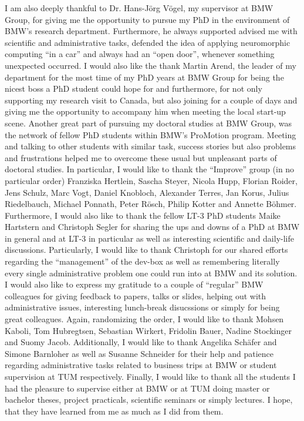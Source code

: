 I am also deeply thankful to Dr. Hans-J\"org V\"ogel, my supervisor at BMW Group, for giving me the opportunity to pursue my PhD in the environment of BMW's research department.
Furthermore, he always supported advised me with scientific and administrative tasks, defended the idea of applying neuromorphic computing \enquote{in a car} and always had an \enquote{open door}, whenever something unexpected occurred.
I would also like the thank Martin Arend, the leader of my department for the most time of my PhD years at BMW Group for being the nicest boss a PhD student could hope for and furthermore, for not only supporting my research visit to Canada, but also joining for a couple of days and giving me the opportunity to accompany him when meeting the local start-up scene.
Another great part of pursuing my doctoral studies at BMW Group, was the network of fellow PhD students within BMW's ProMotion program.
Meeting and talking to other students with similar task, success stories but also problems and frustrations helped me to overcome these usual but unpleasant parts of doctoral studies.
In particular, I would like to thank the \enquote{Improve} group (in no particular order) Franziska Hertlein, Sascha Steyer, Nicola Hupp, Florian Roider, Jens Schulz, Marc Vogt, Daniel Knobloch, Alexander Terres, Jan Korus, Julius Riedelbauch, Michael Ponnath, Peter R\"osch, Philip Kotter and Annette B\"ohmer.
Furthermore, I would also like to thank the fellow LT-3 PhD students Maike Hartstern and Christoph Segler for sharing the ups and downs of a PhD at BMW in general and at LT-3 in particular as well as interesting scientific and daily-life discussions.
Particularly, I would like to thank Christoph for our shared efforts regarding the \enquote{management} of the dev-box as well as remembering literally every single administrative problem one could run into at BMW and its solution.
I would also like to express my gratitude to a couple of \enquote{regular} BMW colleagues for giving feedback to papers, talks or slides, helping out with administrative issues, interesting lunch-break disucssions or simply for being great colleagues.
Again, randomizing the order, I would like to thank Mohsen Kaboli, Tom Hubregtsen, Sebastian Wirkert, Fridolin Bauer, Nadine Stockinger and Suomy Jacob. 
Additionally, I would like to thank Angelika Sch\"afer and Simone Barnloher as well as Susanne Schneider for their help and patience regarding administrative tasks related to business trips at BMW or student supervision at TUM respectively.
Finally, I would like to thank all the students I had the pleasure to supervise either at BMW or at TUM doing master or bachelor theses, project practicals, scientific seminars or simply lectures.
I hope, that they have learned from me as much as I did from them.

